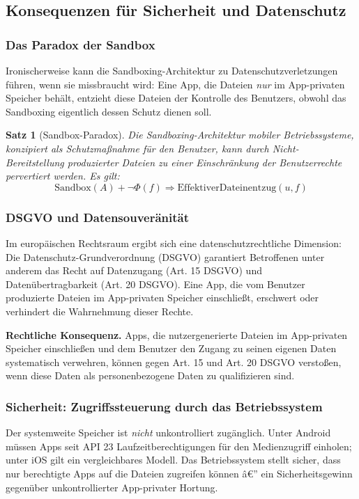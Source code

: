 ﻿\documentclass[12pt, a4paper]{article}
\newtheorem{satz}[definition]{Satz}
\begin{document}
\subsection{Konsequenzen für Sicherheit und Datenschutz}

\subsubsection{Das Paradox der Sandbox}

Ironischerweise kann die Sandboxing-Architektur zu Datenschutzverletzungen
führen, wenn sie missbraucht wird: Eine App, die Dateien \emph{nur} im
App-privaten Speicher behält, entzieht diese Dateien der Kontrolle des
Benutzers, obwohl das Sandboxing eigentlich dessen Schutz dienen soll.

\begin{satz}[Sandbox-Paradox]
Die Sandboxing-Architektur mobiler Betriebssysteme, konzipiert als Schutzmaßnahme
für den Benutzer, kann durch Nicht-Bereitstellung produzierter Dateien zu einer
Einschränkung der Benutzerrechte pervertiert werden. Es gilt:
\[
  \text{Sandbox}(A) + \neg\Phi(f) \Rightarrow \text{EffektiverDateinentzug}(u, f)
\]
\end{satz}

\subsubsection{DSGVO und Datensouveränität}

Im europäischen Rechtsraum ergibt sich eine datenschutzrechtliche Dimension:
Die Daten\-schutz-Grundverordnung (DSGVO) garantiert Betroffenen unter anderem
das Recht auf Datenzugang (Art. 15 DSGVO) und Datenübertragbarkeit (Art. 20 DSGVO).
Eine App, die vom Benutzer produzierte Dateien im App-privaten Speicher einschließt,
erschwert oder verhindert die Wahrnehmung dieser Rechte.

\noindent\textbf{Rechtliche Konsequenz.} Apps, die nutzergenerierte Dateien im App-privaten Speicher einschließen und
dem Benutzer den Zugang zu seinen eigenen Daten systematisch verwehren,
können gegen Art. 15 und Art. 20 DSGVO verstoßen, wenn diese Daten als
personenbezogene Daten zu qualifizieren sind.

\subsubsection{Sicherheit: Zugriffssteuerung durch das Betriebssystem}

Der systemweite Speicher ist \emph{nicht} unkontrolliert zugänglich. Unter
Android müssen Apps seit API 23 Laufzeitberechtigungen für den Medienzugriff
einholen; unter iOS gilt ein vergleichbares Modell. Das Betriebssystem stellt
sicher, dass nur berechtigte Apps auf die Dateien zugreifen können â€” ein
Sicherheitsgewinn gegenüber unkontrollierter App-privater Hortung.
\end{document}
